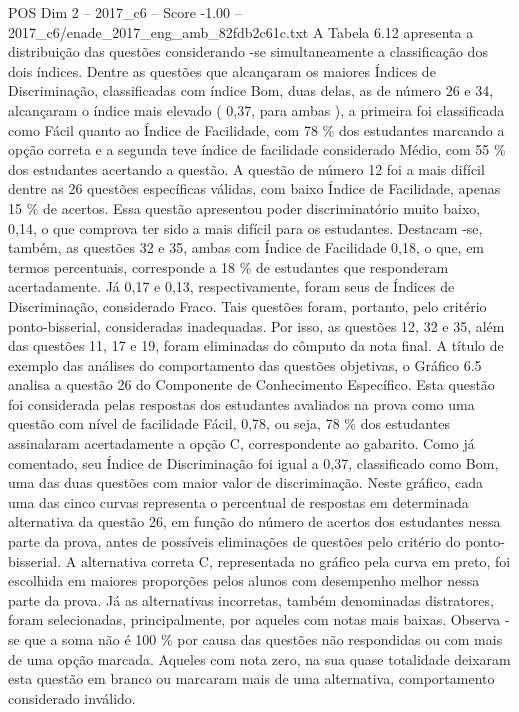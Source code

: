 \begin{textsample}{POS Dim 2 – 2017\_c6 – Score -1.00 – 2017\_c6/enade\_2017\_eng\_amb\_82fdb2c61c.txt}
A Tabela 6.12 apresenta a distribuição das questões considerando -se simultaneamente a classificação dos dois índices.
Dentre as questões que alcançaram os maiores Índices de Discriminação, classificadas com índice Bom, duas delas, as de número 26 e 34, alcançaram o índice mais elevado ( 0,37, para ambas ), a primeira foi classificada como Fácil quanto ao Índice de Facilidade, com 78 \% dos estudantes marcando a opção correta e a segunda teve índice de facilidade considerado Médio, com 55 \% dos estudantes acertando a questão.
A questão de número 12 foi a mais difícil dentre as 26 questões específicas válidas, com baixo Índice de Facilidade, apenas 15 \% de acertos.
Essa questão apresentou poder discriminatório muito baixo, 0,14, o que comprova ter sido a mais difícil para os estudantes.
Destacam -se, também, as questões 32 e 35, ambas com Índice de Facilidade 0,18, o que, em termos percentuais, corresponde a 18 \% de estudantes que responderam acertadamente.
Já 0,17 e 0,13, respectivamente, foram seus de Índices de Discriminação, considerado Fraco.
Tais questões foram, portanto, pelo critério ponto-bisserial, consideradas inadequadas.
Por isso, as questões 12, 32 e 35, além das questões 11, 17 e 19, foram eliminadas do cômputo da nota final.
A título de exemplo das análises do comportamento das questões objetivas, o Gráfico 6.5 analisa a questão 26 do Componente de Conhecimento Específico.
Esta questão foi considerada pelas respostas dos estudantes avaliados na prova como uma questão com nível de facilidade Fácil, 0,78, ou seja, 78 \% dos estudantes assinalaram acertadamente a opção C, correspondente ao gabarito.
Como já comentado, seu Índice de Discriminação foi igual a 0,37, classificado como Bom, uma das duas questões com maior valor de discriminação.
Neste gráfico, cada uma das cinco curvas representa o percentual de respostas em determinada alternativa da questão 26, em função do número de acertos dos estudantes nessa parte da prova, antes de possíveis eliminações de questões pelo critério do ponto-bisserial.
A alternativa correta C, representada no gráfico pela curva em preto, foi escolhida em maiores proporções pelos alunos com desempenho melhor nessa parte da prova.
Já as alternativas incorretas, também denominadas distratores, foram selecionadas, principalmente, por aqueles com notas mais baixas.
Observa -se que a soma não é 100 \% por causa das questões não respondidas ou com mais de uma opção marcada.
Aqueles com nota zero, na sua quase totalidade deixaram esta questão em branco ou marcaram mais de uma alternativa, comportamento considerado inválido.

\end{textsample}
